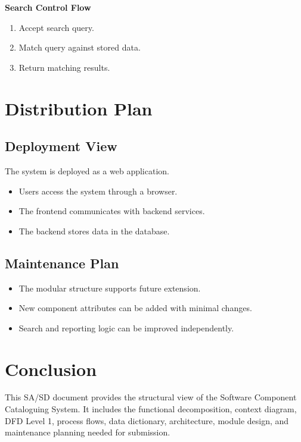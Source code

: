 \documentclass[12pt]{article}
\begin{document}
\textbf{Search Control Flow}
\begin{enumerate}[leftmargin=1.2cm]
    \item Accept search query.
    \item Match query against stored data.
    \item Return matching results.
\end{enumerate}

\section{Distribution Plan}
\subsection{Deployment View}
The system is deployed as a web application.
\begin{itemize}[leftmargin=1.2cm]
    \item Users access the system through a browser.
    \item The frontend communicates with backend services.
    \item The backend stores data in the database.
\end{itemize}

\subsection{Maintenance Plan}
\begin{itemize}[leftmargin=1.2cm]
    \item The modular structure supports future extension.
    \item New component attributes can be added with minimal changes.
    \item Search and reporting logic can be improved independently.
\end{itemize}

\section{Conclusion}
This SA/SD document provides the structural view of the Software Component Cataloguing System. It includes the functional decomposition, context diagram, DFD Level 1, process flows, data dictionary, architecture, module design, and maintenance planning needed for submission.
\end{document}
